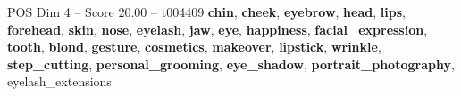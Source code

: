 \begin{textsample}{POS Dim 4 – Score 20.00 – t004409}  \label{ex:f4_pos_022}
\textbf{chin}, \textbf{cheek}, \textbf{eyebrow}, \textbf{head}, \textbf{lips}, \textbf{forehead}, \textbf{skin}, \textbf{nose}, \textbf{eyelash}, \textbf{jaw}, \textbf{eye}, \textbf{happiness}, \textbf{facial\_expression}, \textbf{tooth}, \textbf{blond}, \textbf{gesture}, \textbf{cosmetics}, \textbf{makeover}, \textbf{lipstick}, \textbf{wrinkle}, \textbf{step\_cutting}, \textbf{personal\_grooming}, \textbf{eye\_shadow}, \textbf{portrait\_photography}, eyelash\_extensions

\end{textsample}
